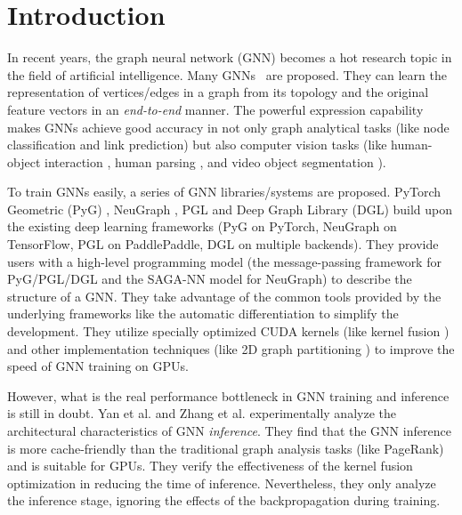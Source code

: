 \section{Introduction}

In recent years, the graph neural network (GNN) becomes a hot research topic in the field of artificial intelligence.
%
Many GNNs~\cite{kipf2017_gcn, defferrad2016_chebnet, li2018_agcn,li2015_ggnn, hamilton2017_graphsage, huang2018_gat, zhang2018_gaan} are proposed.
%
They can learn the representation of vertices/edges in a graph from its topology and the original feature vectors in an \emph{end-to-end} manner.
%
The powerful expression capability makes GNNs achieve good accuracy in not only graph analytical tasks \cite{zhou2018_gnn_review, zhang2018_gnn_survey, comprehensive-survey-wu-2020} (like node classification and link prediction) but also computer vision tasks (like human-object interaction \cite{qi2018_learning_humanobject}, human parsing \cite{wang2020_hierarchical_human_parsing}, and video object segmentation \cite{wang2019_zeroshot_video}).

To train GNNs easily, a series of GNN libraries/systems \cite{PyG, DGL, ma2019_neugraph, zhu2019_aligraph, PGL} are proposed.
%
PyTorch Geometric (PyG) \cite{PyG}, NeuGraph \cite{ma2019_neugraph}, PGL \cite{PGL} and Deep Graph Library (DGL) \cite{DGL} build upon the existing deep learning frameworks (PyG on PyTorch, NeuGraph on TensorFlow, PGL on PaddlePaddle, DGL on multiple backends).
%
They provide users with a high-level programming model (the message-passing framework for PyG/PGL/DGL and the SAGA-NN model for NeuGraph) to describe the structure of a GNN.
%
They take advantage of the common tools provided by the underlying frameworks like the automatic differentiation to simplify the development.
%
They utilize specially optimized CUDA kernels (like kernel fusion \cite{DGL, ma2019_neugraph}) and other implementation techniques (like 2D graph partitioning \cite{ma2019_neugraph}) to improve the speed of GNN training on GPUs.

However, what is the real performance bottleneck in GNN training and inference is still in doubt.
%
Yan et al. \cite{yan2020_characterizing_gcn} and Zhang et al. \cite{zhang2020_analysis_neugraph} experimentally analyze the architectural characteristics of GNN \emph{inference}.
%
They find that the GNN inference is more cache-friendly than the traditional graph analysis tasks (like PageRank) and is suitable for GPUs.
%
They verify the effectiveness of the kernel fusion optimization in reducing the time of inference.
%
Nevertheless, they only analyze the inference stage, ignoring the effects of the backpropagation during training.

